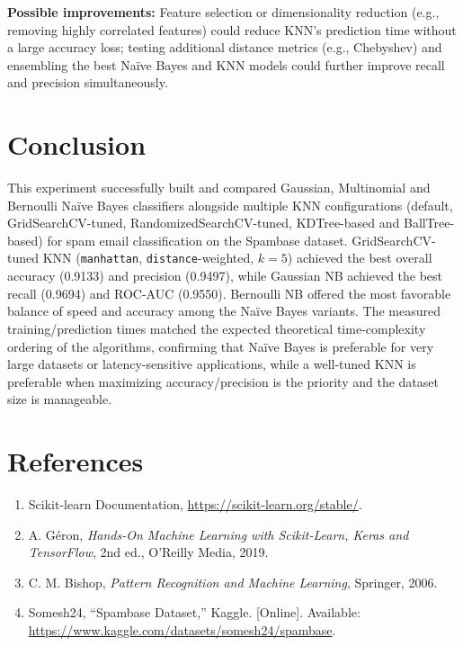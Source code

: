 \documentclass[12pt,a4paper]{article}
\begin{document}
\textbf{Possible improvements:} Feature selection or dimensionality reduction (e.g., removing highly correlated features) could reduce KNN's prediction time without a large accuracy loss; testing additional distance metrics (e.g., Chebyshev) and ensembling the best Na\"ive Bayes and KNN models could further improve recall and precision simultaneously.

\section{Conclusion}
This experiment successfully built and compared Gaussian, Multinomial and Bernoulli Na\"ive Bayes classifiers alongside multiple KNN configurations (default, GridSearchCV-tuned, RandomizedSearchCV-tuned, KDTree-based and BallTree-based) for spam email classification on the Spambase dataset. GridSearchCV-tuned KNN (\texttt{manhattan}, \texttt{distance}-weighted, $k=5$) achieved the best overall accuracy (0.9133) and precision (0.9497), while Gaussian NB achieved the best recall (0.9694) and ROC-AUC (0.9550). Bernoulli NB offered the most favorable balance of speed and accuracy among the Na\"ive Bayes variants. The measured training/prediction times matched the expected theoretical time-complexity ordering of the algorithms, confirming that Na\"ive Bayes is preferable for very large datasets or latency-sensitive applications, while a well-tuned KNN is preferable when maximizing accuracy/precision is the priority and the dataset size is manageable.

\section{References}
\begin{enumerate}
\item Scikit-learn Documentation, \url{https://scikit-learn.org/stable/}.
\item A. G\'eron, \emph{Hands-On Machine Learning with Scikit-Learn, Keras and TensorFlow}, 2nd ed., O'Reilly Media, 2019.
\item C. M. Bishop, \emph{Pattern Recognition and Machine Learning}, Springer, 2006.
\item Somesh24, ``Spambase Dataset,'' Kaggle. [Online]. Available: \url{https://www.kaggle.com/datasets/somesh24/spambase}.
\end{enumerate}
\end{document}
